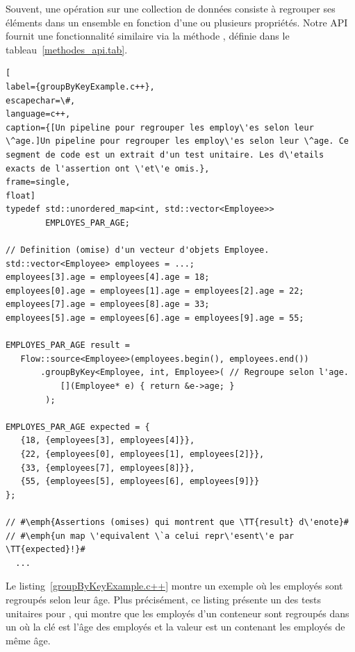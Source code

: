 Souvent, une op\'eration sur une collection de donn\'ees consiste \`a regrouper ses \'el\'ements dans un ensemble en fonction d'une ou plusieurs propri\'et\'es. Notre {API} fournit une fonctionnalit\'e similaire via la m\'ethode , d\'efinie dans le tableau~\ref{methodes_api.tab}. 


\begin{lstlisting}[
label={groupByKeyExample.c++},
escapechar=\#,
language=c++,
caption={[Un pipeline pour regrouper les employ\'es selon leur \^age.]Un pipeline pour regrouper les employ\'es selon leur \^age. Ce segment de code est un extrait d'un test unitaire. Les d\'etails exacts de l'assertion ont \'et\'e omis.},
frame=single,
float]
typedef std::unordered_map<int, std::vector<Employee>> 
        EMPLOYES_PAR_AGE;

// Definition (omise) d'un vecteur d'objets Employee.
std::vector<Employee> employees = ...; 
employees[3].age = employees[4].age = 18;
employees[0].age = employees[1].age = employees[2].age = 22;
employees[7].age = employees[8].age = 33;
employees[5].age = employees[6].age = employees[9].age = 55;

EMPLOYES_PAR_AGE result = 
   Flow::source<Employee>(employees.begin(), employees.end())
       .groupByKey<Employee, int, Employee>( // Regroupe selon l'age.
           [](Employee* e) { return &e->age; } 
        );
    
EMPLOYES_PAR_AGE expected = {
   {18, {employees[3], employees[4]}},
   {22, {employees[0], employees[1], employees[2]}},
   {33, {employees[7], employees[8]}},
   {55, {employees[5], employees[6], employees[9]}}
};

// #\emph{Assertions (omises) qui montrent que \TT{result} d\'enote}#
// #\emph{un map \'equivalent \`a celui repr\'esent\'e par \TT{expected}!}#
  ...
\end{lstlisting}




Le listing~\ref{groupByKeyExample.c++} montre un exemple o\`u les employ\'es sont regroup\'es selon leur \^age. Plus pr\'ecis\'ement, ce listing pr\'esente un des tests unitaires pour , qui montre que les employ\'es d'un conteneur sont regroup\'es dans un  o\`u la cl\'e est l'\^age des employ\'es et la valeur est un  contenant les employ\'es de m\^eme \^age.
%

